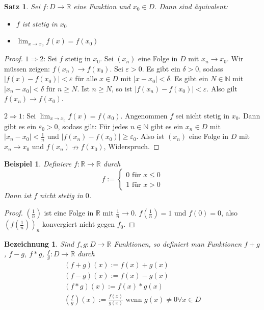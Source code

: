 \documentclass[a4paper,10pt]{article}
\newtheorem{example}{Beispiel}
\newtheorem{satz}{Satz}
\newtheorem{bezeichnung}{Bezeichnung}
\begin{document}
\begin{satz}
 Sei $f: D \rightarrow \mathbb{R}$ eine Funktion und $x_0 \in D$.
 Dann sind äquivalent:
 \begin{itemize}
  \item $f$ ist stetig in $x_0$
  \item $\lim_{x \rightarrow x_0} f(x) = f(x_0)$
 \end{itemize}
\end{satz}

\begin{proof}
 $1 \Rightarrow 2$: Sei $f$ stetig in $x_0$.
 Sei $(x_n)$ eine Folge in $D$ mit $x_n \rightarrow x_0$.
 Wir müssen zeigen: $f(x_n) \rightarrow f(x_0)$.
 Sei $\varepsilon > 0$.
 Es gibt ein $\delta > 0$, sodass $|f(x) - f(x_0)| < \varepsilon$ für alle $x \in D$ mit $|x - x_0| < \delta$.
 Es gibt ein $N \in \mathbb{N}$ mit $|x_n - x_0| < \delta$ für $n \ge N$.
 Ist $n \ge N$, so ist $|f(x_n) - f(x_0)| < \varepsilon$.
 Also gilt $f(x_n) \rightarrow f(x_0)$.
 
 $2 \Rightarrow 1$: Sei $\lim_{x \rightarrow x_0} f(x) = f(x_0)$.
 Angenommen $f$ sei nicht stetig in $x_0$.
 Dann gibt es ein $\varepsilon_0 > 0$, sodass gilt: Für jedes $n \in \mathbb{N}$ gibt es ein $x_n \in D$ mit $|x_n - x_0| < \frac{1}{n}$ und $|f(x_n) - f(x_0)| \ge \varepsilon_0$.
 Also ist $(x_n)$ eine Folge in $D$ mit $x_n \rightarrow x_0$ und $f(x_n) \nrightarrow f(x_0)$, Widerspruch.
\end{proof}

\begin{example}
 Definiere $f: \mathbb{R} \rightarrow \mathbb{R}$ durch
 \begin{equation}
  f := \begin{cases}
        0 \text{ für } x \le 0\\
        1 \text{ für } x > 0
       \end{cases}
 \end{equation}
 Dann ist $f$ nicht stetig in $0$.
\end{example}

\begin{proof}
 $(\frac{1}{n})$ ist eine Folge in $\mathbb{R}$ mit $\frac{1}{n} \rightarrow 0$.
 $f(\frac{1}{n}) = 1$ und $f(0) = 0$, also $(f(\frac{1}{n}))_n$ konvergiert nicht gegen $f_0$.
\end{proof}

\begin{bezeichnung}
 Sind $f, g: D \rightarrow \mathbb{R}$ Funktionen, so definiert man Funktionen $f + g$, $f - g$, $f * g$, $\frac{f}{g}: D \rightarrow \mathbb{R}$ durch
 \begin{align}
  (f + g)(x) := f(x) + g(x)\\
  (f - g)(x) := f(x) - g(x)\\
  (f * g)(x) := f(x) * g(x)\\
  (\frac{f}{g})(x) := \frac{f(x)}{g(x)} \text{ wenn $g(x) \ne 0 \forall x \in D$}
 \end{align}
\end{bezeichnung}
\end{document}
